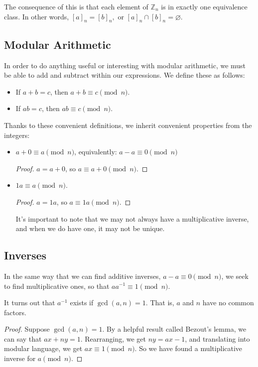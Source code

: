 \documentclass{article}
\begin{document}
The consequence of this is that each element of $\mathbb{Z}_n$ is in exactly one equivalence class. In other words, $[a]_n=[b]_n,$ or $[a]_n\cap [b]_n=\varnothing$.

\subsection{Modular Arithmetic}

In order to do anything useful or interesting with modular arithmetic, we must be able to add and subtract within our expressions. We define these as follows:

\begin{itemize}
    \item If $a+b=c$, then $a+b\equiv c\pmod{n}$.
    \item If $ab=c$, then $ab\equiv c\pmod{n}$.
\end{itemize}
Thanks to these convenient definitions, we inherit convenient properties from the integers:
\begin{itemize}
    \item $a+0\equiv a\pmod{n}$, equivalently: $a-a\equiv 0\pmod{n}$
        \begin{proof} 
            $a=a+0$, so $a\equiv a+0\pmod{n} $.
        \end{proof}
    \item $1a\equiv a\pmod{n}$.
        \begin{proof} 
            $a=1a$, so $a\equiv 1a\pmod{n} $.
        \end{proof}
        It's important to note that we may not always have a multiplicative inverse, and when we do have one, it may not be unique.
\end{itemize}

\subsection{Inverses}

In the same way that we can find additive inverses, $a-a\equiv 0\pmod{ n} $, we seek to find multiplicative ones, so that $aa^{-1}\equiv 1\pmod{n} $.

It turns out that $a^{-1}$ exists if $\gcd(a,n)=1$. That is, $a$ and $n$ have no common factors.
\begin{proof} 
    Suppose $\gcd(a,n)=1$. By a helpful result called Bezout's lemma, we can say that $ax+ny=1$. Rearranging, we get $ny=ax-1$, and translating into modular language, we get $ax\equiv 1\pmod{n} $. So we have found a multiplicative inverse for $a\pmod{n} $.
\end{proof}
\end{document}
